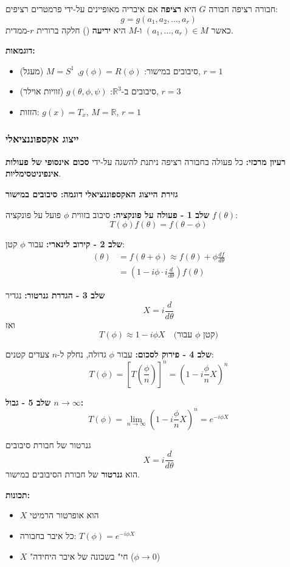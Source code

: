 \begin{definitionbox}[label=def:continuous_group]{חבורה רציפה}
חבורה $G$ היא \textbf{רציפה} אם איבריה מאופיינים על-ידי פרמטרים רציפים:
\[
g = g(a_1, a_2, \ldots, a_r)
\]
כאשר $(a_1, \ldots, a_r) \in M$ ו-$M$ היא \textbf{יריעה} () חלקה ברורית $r$-ממדית.

\textbf{דוגמאות:}
\begin{itemize}
    \item סיבובים במישור: $g(\phi) = R(\phi)$, $M = S^1$ (מעגל), $r = 1$
    \item סיבובים ב-$\mathbb{R}^3$: $g(\theta, \phi, \psi)$ (זוויות אוילר), $r = 3$
    \item הזזות: $g(x) = T_x$, $M = \mathbb{R}$, $r = 1$
\end{itemize}
\end{definitionbox}

\subsubsection{ייצוג אקספוננציאלי}

\textbf{רעיון מרכזי:} כל פעולה בחבורה רציפה ניתנת להשגה על-ידי \textbf{סכום אינסופי של פעולות אינפיניטסימליות}.

\textbf{גזירת הייצוג האקספוננציאלי}
\textbf{דוגמה: סיבובים במישור}

\textbf{שלב 1 - פעולה על פונקציה:} סיבוב בזווית $\phi$ פועל על פונקציה $f(\theta)$:
\[
T(\phi) f(\theta) = f(\theta - \phi)
\]

\textbf{שלב 2 - קירוב לינארי:} עבור $\phi$ קטן:
\begin{align*}
[T(\phi) f](\theta) &= f(\theta +\phi) \approx f(\theta) + \phi \frac{df}{d\theta} \\
&= \left(1 - i\phi \cdot i\frac{d}{d\theta}\right) f(\theta)
\end{align*}

\textbf{שלב 3 - הגדרת גנרטור:} נגדיר
\[
X = i\frac{d}{d\theta}
\]
ואז
\[
T(\phi) \approx 1 - i\phi X \quad \text{(עבור } \phi \text{ קטן)}
\]

\textbf{שלב 4 - פירוק לסכום:} עבור $\phi$ גדולה, נחלק ל-$n$ צעדים קטנים:
\[
T(\phi) = \left[T\left(\frac{\phi}{n}\right)\right]^n = \left(1 - i\frac{\phi}{n} X\right)^n
\]

\textbf{שלב 5 - גבול $n \to \infty$:}
\[
T(\phi) = \lim_{n\to\infty} \left(1 - i\frac{\phi}{n} X\right)^n = e^{-i\phi X}
\]


\begin{importantbox}[label=box:generator]{גנרטור של חבורת סיבובים}
\[
X = i\frac{d}{d\theta}
\]
הוא \textbf{גנרטור} של חבורת הסיבובים במישור.

\textbf{תכונות:}
\begin{itemize}
    \item $X$ הוא אופרטור הרמיטי
    \item כל איבר בחבורה: $T(\phi) = e^{-i\phi X}$
    \item $X$ "חי" בשכונה של איבר היחידה ($\phi \to 0$)
\end{itemize}
\end{importantbox}

